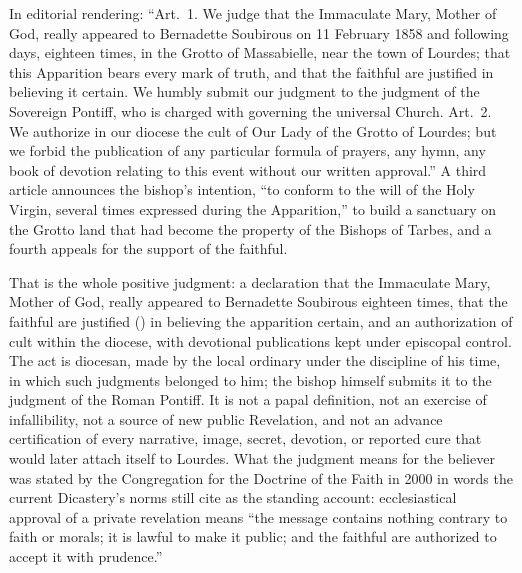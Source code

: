 In editorial rendering: ``Art.~1. We judge that the Immaculate Mary,
Mother of God, really appeared to Bernadette Soubirous on 11
February 1858 and following days, eighteen times, in the Grotto of
Massabielle, near the town of Lourdes; that this Apparition bears
every mark of truth, and that the faithful are justified in
believing it certain. We humbly submit our judgment to the judgment
of the Sovereign Pontiff, who is charged with governing the
universal Church. Art.~2. We authorize in our diocese the cult of
Our Lady of the Grotto of Lourdes; but we forbid the publication of
any particular formula of prayers, any hymn, any book of devotion
relating to this event without our written approval.'' A third
article announces the bishop's intention, ``to conform to the will
of the Holy Virgin, several times expressed during the
Apparition,'' to build a sanctuary on the Grotto land that had
become the property of the Bishops of Tarbes, and a fourth appeals
for the support of the faithful.

That is the whole positive judgment: a declaration that the
Immaculate Mary, Mother of God, really appeared to Bernadette
Soubirous eighteen times, that the faithful are justified
() in believing the apparition certain, and an
authorization of cult within the diocese, with devotional
publications kept under episcopal control. The act is diocesan, made
by the local ordinary under the discipline of his time, in which
such judgments belonged to him; the bishop himself submits it to the
judgment of the Roman Pontiff. It is not a papal definition, not an
exercise of infallibility, not a source of new public Revelation,
and not an advance certification of every narrative, image, secret,
devotion, or reported cure that would later attach itself to
Lourdes. What the judgment means for the believer was stated by the
Congregation for the Doctrine of the Faith in 2000 in words the
current Dicastery's norms still cite as the standing account:
ecclesiastical approval of a private revelation means ``the message
contains nothing contrary to faith or morals; it is lawful to make
it public; and the faithful are authorized to accept it with
prudence.''

